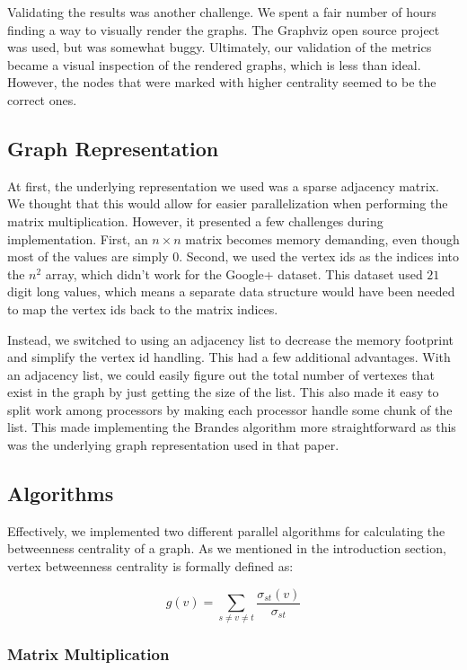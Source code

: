 \documentclass[11pt,a4paper,titlepage]{article}
\begin{document}
Validating the results was another challenge. We spent a fair number of hours
finding a way to visually render the graphs. The Graphviz open source project
was used, but was somewhat buggy. Ultimately, our validation of the metrics
became a visual inspection of the rendered graphs, which is less than ideal.
However, the nodes that were marked with higher centrality seemed to be the
correct ones.


\subsection{Graph Representation}

At first, the underlying representation we used was a sparse adjacency matrix.
We thought that this would allow for easier parallelization when performing the
matrix multiplication. However, it presented a few challenges during
implementation. First, an $n \times n$ matrix becomes memory demanding, even
though most of the values are simply $0$. Second, we used the vertex ids as
the indices into the $n^2$ array, which didn't work for the Google+ dataset.
This dataset used $21$ digit long values, which means a separate data structure
would have been needed to map the vertex ids back to the matrix indices.

Instead, we switched to using an adjacency list to decrease the memory
footprint and simplify the vertex id handling. This had a few additional
advantages. With an adjacency list, we could easily figure out the total number
of vertexes that exist in the graph by just getting the size of the list. This
also made it easy to split work among processors by making each processor
handle some chunk of the list. This made implementing the Brandes algorithm
more straightforward as this was the underlying graph representation used in
that paper.


\subsection{Algorithms}

Effectively, we implemented two different parallel algorithms for calculating
the betweenness centrality of a graph. As we mentioned in the introduction
section, vertex betweenness centrality is formally defined as:

\[ g(v) = \sum_{s \neq v \neq t}{\frac{\sigma_{st}(v)}{\sigma_{st}}} \]

\subsubsection{Matrix Multiplication}
\end{document}
